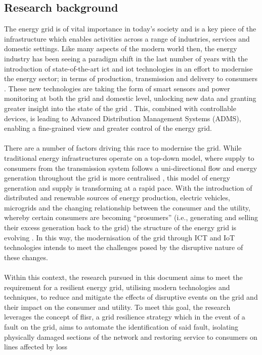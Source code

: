 \subsection{Research background}
\label{sec:background}

The energy grid is of vital importance in today's society and is a key piece of the infrastructure which enables activities across a range of industries, services and domestic settings. Like many
aspects of the modern world then, the energy industry has been seeing a paradigm shift in the last number of years with the introduction of state-of-the-art \acs{ict} and \acs{iot} technologies
in an effort to modernise the energy sector; in terms of production, transmission and delivery to consumers \cite{6099519}. These new technologies are taking the form of smart sensors and
power monitoring at both the grid and domestic level, unlocking new data and granting greater insight into the state of the grid \cite{7123563}. This, combined with controllable devices, is leading
to Advanced Distribution Management Systems (ADMS), enabling a fine-grained view and greater control of the energy grid.
\\
\\
There are a number of factors driving this race to modernise the grid. While traditional energy infrastructures operate on a top-down model, where supply to consumers from the transmission system
follows a uni-directional flow and energy generation throughout the grid is more centralised \cite{5628271}, this model of energy generation and supply is transforming at a rapid pace. With the introduction of distributed and renewable sources of
energy production, electric vehicles, microgrids and the changing relationship between the consumer and the utility, whereby certain consumers are becoming ``prosumers'' (i.e., generating and selling their excess generation back to the grid)
the structure of the energy grid is evolving \cite{5357331}. In this way, the modernisation of the grid through ICT and IoT technologies intends to meet the challenges posed by the disruptive nature of these changes.
\\
\\
Within this context, the research pursued in this document aims to meet the requirement for a resilient energy grid, utilising modern technologies and techniques, to reduce and mitigate the effects of disruptive events on the grid
and their impact on the consumer and utility. To meet this goal, the research leverages the concept of \ac{flisr}, a grid resilience
strategy which in the event of a fault on the grid, aims to automate the identification of said fault, isolating physically damaged sections of the network and restoring service to consumers on lines affected by loss
